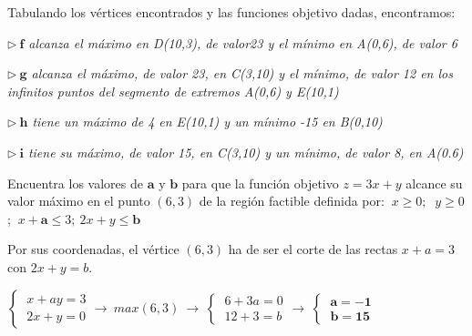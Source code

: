 Tabulando los vértices encontrados y las funciones objetivo dadas, encontramos:

\vspace{3mm} \emph{$\triangleright\ \boldsymbol{f}$ alcanza el máximo en D(10,3), de valor23 y el mínimo en A(0,6), de valor 6}

\vspace{3mm} \emph{$\triangleright\ \boldsymbol{g}$  alcanza el máximo, de valor 23, en C(3,10) y el mínimo, de valor 12 en los infinitos puntos del segmento de extremos A(0,6) y E(10,1)}

\vspace{3mm} \emph{$\triangleright\ \boldsymbol{h}$  tiene un máximo de 4 en E(10,1) y un mínimo -15 en B(0,10)}

\vspace{3mm} \emph{$\triangleright\ \boldsymbol{i}$ tiene su máximo, de valor 15, en C(3,10) y un mínimo, de valor 8, en A(0.6)}


\vspace{10mm}
\begin{ejemplo}
\begin{ejer}
	Encuentra los valores de $\boldsymbol{a}$ y $\boldsymbol{b}$ para que la función objetivo $z=3x+y$ alcance su valor máximo en el punto $(6,3)$ de la región factible definida por: $\ x\ge 0;\ $ $y\ge 0$; $\ x+\boldsymbol{a} \le 3$$; $$\ 2x+y\le \boldsymbol{b}$
\end{ejer}	
\end{ejemplo}
\vspace{5mm}

Por sus coordenadas, el vértice $(6,3)$ ha de ser el corte de las rectas $x+a=3$ con $2x+y=b$.

$\begin{cases} \ x+ay=3 \\ \ 2x+y=0 \end{cases} \to \ max(6,3)\  \to \ \begin{cases} \ 6+3a=0 \\ \ 12+3=b \end{cases} \to \ \begin{cases} \ \boldsymbol{a=-1} \\ \ \boldsymbol{b=15} \end{cases}$

